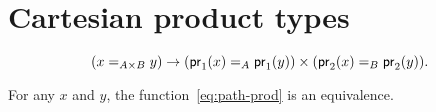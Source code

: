 \documentclass[hott-all.tex]{subfiles}
\begin{document}
\section{Cartesian product types}
\label{sec:compute-cartprod}
%
\begin{equation}\label{eq:path-prod}
  (\id[A\times B]{x}{y}) \to (\id[A]{\proj1(x)}{\proj1(y)}) \times (\id[B]{\proj2(x)}{\proj2(y)}).
\end{equation}
%
\begin{thm}\label{thm:path-prod}
  For any $x$ and $y$, the function~\eqref{eq:path-prod} is an equivalence.
\end{thm}
%
%
%
%
\end{document}
